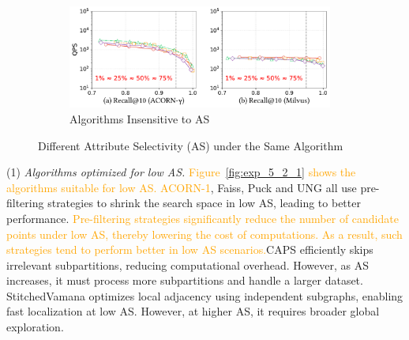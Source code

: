 \documentclass[sigconf, nonacm]{acmart}
\begin{document}
{\begin{figure}
\begin{subfigure}{0.33\textwidth}
			\includegraphics[width=0.96\textwidth]{figures/exp/exp_5_2_3.pdf}
			\caption{Algorithms Insensitive to AS}
			\label{fig:exp_5_2_3}
		\end{subfigure}
		
		
		\caption{Different Attribute Selectivity (AS) under the Same Algorithm}
		\label{fig:exp_5_2_combined}
	\end{figure}
	
	
	
	
	(1) \textit{Algorithms optimized for low AS.}  
	\textcolor{orange}{Figure~\ref{fig:exp_5_2_1} shows the algorithms suitable for low AS.}
	\textcolor{orange}{ACORN-1}, Faiss, Puck and UNG all use pre-filtering strategies to shrink the search space in low AS, leading to better performance. \textcolor{orange}{Pre-filtering strategies significantly reduce the number of candidate points under low AS, thereby lowering the cost of  computations. As a result, such strategies tend to perform better in low AS scenarios.}CAPS efficiently skips irrelevant subpartitions, reducing computational overhead. However, as AS increases, it must process more subpartitions and handle a larger dataset. StitchedVamana optimizes local adjacency using independent subgraphs, enabling fast localization at low AS. However, at higher AS, it requires broader global exploration. 
	
	
	
}
\end{document}
